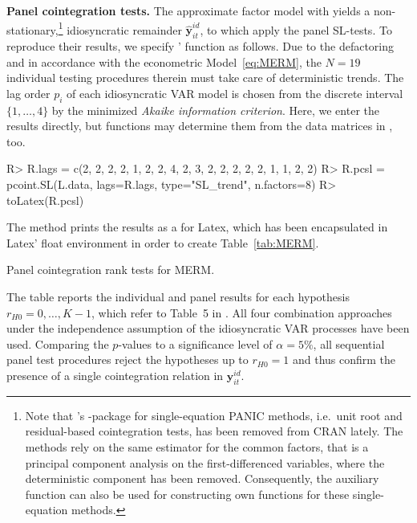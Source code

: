 \textbf{Panel cointegration tests.} The approximate factor model with  yields a non-stationary,\footnote{Note that \citeauthor{Bronder2016}'s \citeyearpar{Bronder2016} -package  for single-equation PANIC methods, i.e.~unit root and residual-based cointegration tests, has been removed from CRAN lately. The methods rely on the same estimator for the common factors, that is a principal component analysis on the first-differenced variables, where the deterministic component has been removed. Consequently, the auxiliary function  can also be used for constructing own functions for these single-equation methods.} idiosyncratic remainder $ \boldsymbol{\hat{y}}^{i \! d}_{it} $, to which \citet{ArsovaOersal2017} apply the panel SL-tests. To reproduce their results, we specify ' function  as follows. Due to the defactoring and in accordance with the econometric Model~\eqref{eq:MERM}, the $ N=19 $ individual testing procedures therein must take care of deterministic trends. The lag order $ p_i $ of each idiosyncratic VAR model is chosen from the discrete interval $ \lbrace 1,\ldots,4 \rbrace $ by the minimized \textit{Akaike information criterion}. Here, we enter the results directly, but  functions may determine them from the data matrices in , too.
\begin{CodeChunk}
\begin{CodeInput}
R> R.lags = c(2, 2, 2, 2, 1, 2, 2, 4, 2, 3, 2, 2, 2, 2, 2, 1, 1, 2, 2)
R> R.pcsl = pcoint.SL(L.data, lags=R.lags, type="SL_trend", n.factors=8)
R> toLatex(R.pcsl)
\end{CodeInput}
\end{CodeChunk}
The method  prints the  results as a  for Latex, which has been encapsulated in Latex' float environment in order to create Table~\ref{tab:MERM}. 
\begin{table}[ht]	%
	\centering
	\caption[Cointegration rank tests]{Panel cointegration rank tests for MERM.} 
	\resizebox{0.8\textwidth}{!}{
		}	
	\label{tab:MERM}
\end{table}
The table reports the individual and panel results for each hypothesis $ r_{H0} = 0, \ldots, K-1 $, which refer to Table~5 in \citet[p.~68]{ArsovaOersal2017}. All four combination approaches under the independence assumption of the idiosyncratic VAR processes have been used. Comparing the $p$-values to a significance level of $ \alpha = 5 \% $, all sequential panel test procedures reject the hypotheses up to $ r_{H0} = 1 $ and thus confirm the presence of a single cointegration relation in $ \boldsymbol{{y}}^{i \! d}_{it} $.


